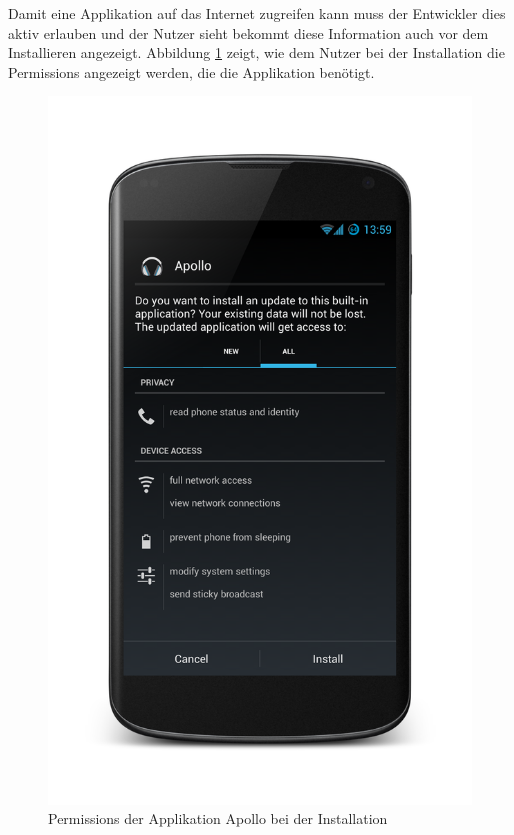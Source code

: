Damit eine Applikation auf das Internet zugreifen kann muss der Entwickler dies aktiv erlauben und der Nutzer sieht bekommt diese Information auch vor dem Installieren angezeigt. Abbildung \ref{permissions} zeigt, wie dem Nutzer bei der Installation die Permissions angezeigt werden, die die Applikation benötigt. 

\begin{figure}[ht!]
\begin{center}
\includegraphics[scale=0.2]{images/permissions}
\caption{Permissions der Applikation Apollo bei der Installation}
\label{permissions}
\end{center}
\end{figure}


